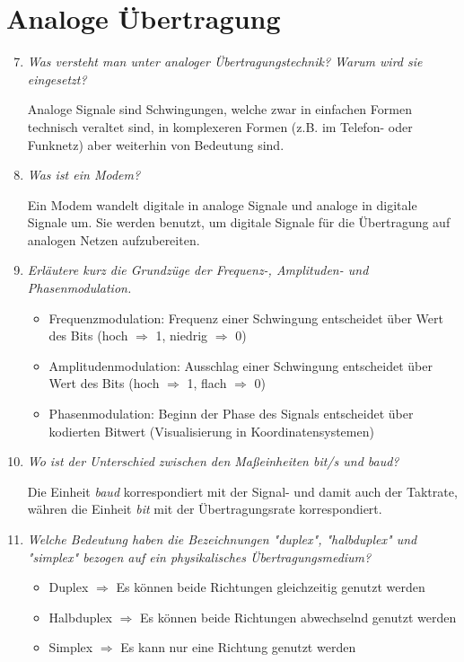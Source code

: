 \documentclass[hidelinks]{article}
\begin{document}
\section{Analoge Übertragung}
\begin{enumerate}
\setcounter{enumi}{6}
\item \textit{Was versteht man unter analoger Übertragungstechnik? Warum wird sie eingesetzt?}

Analoge Signale sind Schwingungen, welche zwar in einfachen Formen technisch veraltet sind, in komplexeren Formen (z.B. im Telefon- oder Funknetz) aber weiterhin von Bedeutung sind.

\item \textit{Was ist ein Modem?}

Ein Modem wandelt digitale in analoge Signale und analoge in digitale Signale um. Sie werden benutzt, um digitale Signale für die Übertragung auf analogen Netzen aufzubereiten.

\item \textit{Erläutere kurz die Grundzüge der Frequenz-, Amplituden- und Phasenmodulation.}

\begin{itemize}
\item Frequenzmodulation: Frequenz einer Schwingung entscheidet über Wert des Bits (hoch $\Rightarrow$ 1, niedrig $\Rightarrow$ 0)
\item Amplitudenmodulation: Ausschlag einer Schwingung entscheidet über Wert des Bits (hoch $\Rightarrow$ 1, flach $\Rightarrow$ 0)
\item Phasenmodulation: Beginn der Phase des Signals entscheidet über kodierten Bitwert (Visualisierung in Koordinatensystemen)
\end{itemize}

\item \textit{Wo ist der Unterschied zwischen den Maßeinheiten bit/s und baud?}

Die Einheit \textit{baud} korrespondiert mit der Signal- und damit auch der Taktrate, währen die Einheit \textit{bit} mit der Übertragungsrate korrespondiert.

\item \textit{Welche Bedeutung haben die Bezeichnungen "duplex", "halbduplex" und "simplex" bezogen auf ein physikalisches Übertragungsmedium?}

\begin{itemize}
\item Duplex $\Rightarrow$ Es können beide Richtungen gleichzeitig genutzt werden
\item Halbduplex $\Rightarrow$ Es können beide Richtungen abwechselnd genutzt werden
\item Simplex $\Rightarrow$ Es kann nur eine Richtung genutzt werden
\end{itemize}


\end{enumerate}
\end{document}
